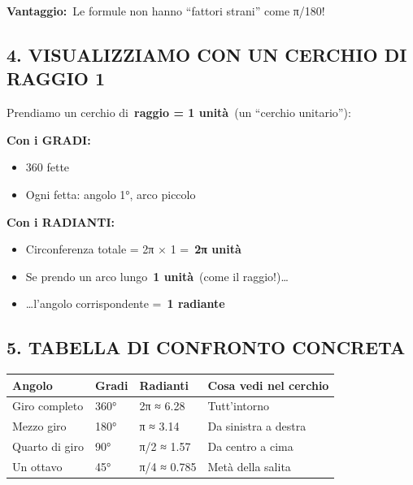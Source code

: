 \documentclass[
]{article}
\providecommand{\tightlist}{%
  \setlength{\itemsep}{0pt}\setlength{\parskip}{0pt}}
\begin{document}
\textbf{Vantaggio:}~Le formule non hanno ``fattori strani'' come π/180!

\hypertarget{visualizziamo-con-un-cerchio-di-raggio-1}{%
\subsection{\texorpdfstring{\textbf{4. VISUALIZZIAMO CON UN CERCHIO DI RAGGIO 1}}{4. VISUALIZZIAMO CON UN CERCHIO DI RAGGIO 1}}\label{visualizziamo-con-un-cerchio-di-raggio-1}}

Prendiamo un cerchio di~\textbf{raggio = 1 unità}~(un ``cerchio unitario''):

\textbf{Con i GRADI:}

\begin{itemize}
\tightlist
\item
  360 fette
\item
  Ogni fetta: angolo 1°, arco piccolo
\end{itemize}

\textbf{Con i RADIANTI:}

\begin{itemize}
\tightlist
\item
  Circonferenza totale = 2π × 1 =~\textbf{2π unità}
\item
  Se prendo un arco lungo~\textbf{1 unità}~(come il raggio!)\ldots{}
\item
  \ldots l'angolo corrispondente =~\textbf{1 radiante}
\end{itemize}

\hypertarget{tabella-di-confronto-concreta}{%
\subsection{\texorpdfstring{\textbf{5. TABELLA DI CONFRONTO CONCRETA}}{5. TABELLA DI CONFRONTO CONCRETA}}\label{tabella-di-confronto-concreta}}

\begin{longtable}[]{@{}llll@{}}
\toprule\noalign{}
\textbf{Angolo} & \textbf{Gradi} & \textbf{Radianti} & \textbf{Cosa vedi nel cerchio} \\
\midrule\noalign{}
\endhead
\bottomrule\noalign{}
\endlastfoot
Giro completo & 360° & 2π ≈ 6.28 & Tutt'intorno \\
Mezzo giro & 180° & π ≈ 3.14 & Da sinistra a destra \\
Quarto di giro & 90° & π/2 ≈ 1.57 & Da centro a cima \\
Un ottavo & 45° & π/4 ≈ 0.785 & Metà della salita \\
\end{longtable}
\end{document}
